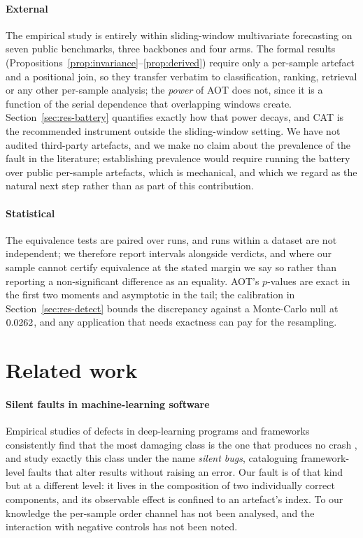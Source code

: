 \documentclass[a4paper,fleqn]{cas-sc}
\begin{document}
\paragraph{External}
The empirical study is entirely within sliding-window multivariate forecasting on
seven public benchmarks, three backbones and four arms. The formal results
(Propositions~\ref{prop:invariance}--\ref{prop:derived}) require only a
per-sample artefact and a positional join, so they transfer verbatim to
classification, ranking, retrieval or any other per-sample analysis; the
\emph{power} of AOT does not, since it is a function of the serial dependence that
overlapping windows create. Section~\ref{sec:res-battery} quantifies exactly how
that power decays, and CAT is the recommended instrument outside the
sliding-window setting. We have not audited third-party artefacts, and we make no
claim about the prevalence of the fault in the literature; establishing prevalence
would require running the battery over public per-sample artefacts, which is
mechanical, and which we regard as the natural next step rather than as part of
this contribution.

\paragraph{Statistical}
The equivalence tests are paired over runs, and runs within a dataset are not
independent; we therefore report intervals alongside verdicts, and where our
sample cannot certify equivalence at the stated margin we say so rather than
reporting a non-significant difference as an equality. AOT's $p$-values are exact
in the first two moments and asymptotic in the tail; the calibration in
Section~\ref{sec:res-detect} bounds the discrepancy against a Monte-Carlo null at
$0.0262{}$, and any application that needs exactness can pay for the
resampling.

\section{Related work}
\label{sec:related}

\paragraph{Silent faults in machine-learning software}
Empirical studies of defects in deep-learning programs and frameworks consistently
find that the most damaging class is the one that produces no crash
\citep{zhang2018tf,islam2019}, and \citet{tambon2024} study exactly this class
under the name \emph{silent bugs}, cataloguing framework-level faults that alter
results without raising an error. Our fault is of that kind but at a different
level: it lives in the composition of two individually correct components, and its
observable effect is confined to an artefact's index. To our knowledge the
per-sample order channel has not been analysed, and the interaction with negative
controls has not been noted.
\end{document}
